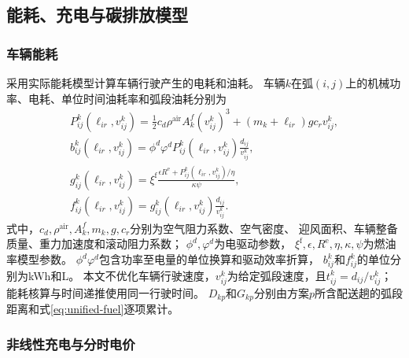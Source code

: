 \documentclass{setp-new}
\begin{document}
\subsection{能耗、充电与碳排放模型}

\subsubsection{车辆能耗}

采用实际能耗模型计算车辆行驶产生的电耗和油耗\cite{ref:23}。
车辆$k$在弧$(i,j)$上的机械功率、电耗、单位时间油耗率和弧段油耗分别为
\begin{gather}
P_{ij}^{k}(\ell_{ir},v_{ij}^{k})
=\frac{1}{2}c_d\rho^{\mathrm{air}}A_k^{f}(v_{ij}^{k})^3
+(m_k+\ell_{ir})gc_rv_{ij}^{k},
\label{eq:unified-power}\\
b_{ij}^{k}(\ell_{ir},v_{ij}^{k})
=\phi^{d}\varphi^{d}P_{ij}^{k}(\ell_{ir},v_{ij}^{k})
\frac{d_{ij}}{v_{ij}^{k}},
\label{eq:unified-electricity}\\
g_{ij}^{k}(\ell_{ir},v_{ij}^{k})
=\xi^{\mathrm f}\frac{\epsilon R^{\mathrm e}
+P_{ij}^{k}(\ell_{ir},v_{ij}^{k})/\eta}{\kappa\psi},
\label{eq:unified-fuel-rate}\\
f_{ij}^{k}(\ell_{ir},v_{ij}^{k})
=g_{ij}^{k}(\ell_{ir},v_{ij}^{k})\frac{d_{ij}}{v_{ij}^{k}}.
\label{eq:unified-fuel}
\end{gather}
式中，$c_d,\rho^{\mathrm{air}},A_k^{f},m_k,g,c_r$分别为空气阻力系数、空气密度、
迎风面积、车辆整备质量、重力加速度和滚动阻力系数；
$\phi^{d},\varphi^{d}$为电驱动参数，
$\xi^{\mathrm f},\epsilon,R^{\mathrm e},\eta,\kappa,\psi$为燃油率模型参数。
$\phi^{d}\varphi^{d}$包含功率至电量的单位换算和驱动效率折算，
$b_{ij}^{k}$和$f_{ij}^{k}$的单位分别为kWh和L。
本文不优化车辆行驶速度，$v_{ij}^{k}$为给定弧段速度，且$t_{ij}^{k}=d_{ij}/v_{ij}^{k}$；
能耗核算与时间递推使用同一行驶时间。
$D_{kp}$和$G_{kp}$分别由方案$p$所含配送趟的弧段距离和式\eqref{eq:unified-fuel}逐项累计。

\subsubsection{非线性充电与分时电价}
\end{document}
